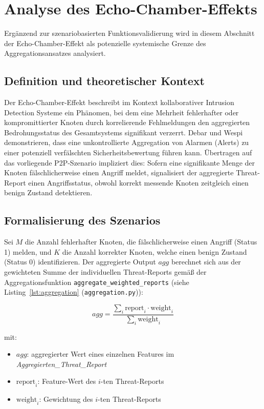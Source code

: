 \section{Analyse des Echo-Chamber-Effekts}
\label{sec:analyse_des_echo_chamber_effekts}
Ergänzend zur szenariobasierten Funktionsvalidierung wird in diesem Abschnitt der Echo-Chamber-Effekt als potenzielle systemische Grenze des Aggregationsansatzes analysiert.

\subsection{Definition und theoretischer Kontext}
Der Echo-Chamber-Effekt beschreibt im Kontext kollaborativer Intrusion Detection Systeme ein Phänomen, bei dem eine Mehrheit fehlerhafter oder kompromittierter Knoten durch korrelierende Fehlmeldungen den aggregierten Bedrohungsstatus des Gesamtsystems signifikant verzerrt. 
Debar und Wespi \cite{debar2001aggregation} demonstrieren, dass eine unkontrollierte Aggregation von Alarmen (Alerts) zu einer potenziell verfälschten Sicherheitsbewertung führen kann. Übertragen auf das vorliegende P2P-Szenario impliziert dies: Sofern eine signifikante Menge der Knoten fälschlicherweise einen Angriff meldet, signalisiert der aggregierte Threat-Report einen Angriffsstatus, obwohl korrekt messende Knoten zeitgleich einen benign Zustand detektieren.

\subsection{Formalisierung des Szenarios}
Sei $M$ die Anzahl fehlerhafter Knoten, die fälschlicherweise einen Angriff (Status 1) melden, und $K$ die Anzahl korrekter Knoten, welche einen benign Zustand (Status 0) identifizieren. Der aggregierte Output $agg$ berechnet sich aus der gewichteten Summe der individuellen Threat-Reports gemäß der Aggregationsfunktion \texttt{aggregate\_weighted\_reports} (siehe Listing~\ref{lst:aggregation} (\texttt{aggregation.py})):

\begin{equation}
    agg = \frac{\sum_{i} \text{report}_i \cdot \text{weight}_i}{\sum_{i} \text{weight}_i}
\end{equation}

\vspace{0.2cm}

\noindent
mit:
\begin{itemize}
    \item \(agg\): aggregierter Wert eines einzelnen Features im \textit{Aggregierten\_Threat\_Report}
    \item \(\text{report}_i\): Feature-Wert des \(i\)-ten Threat-Reports
    \item \(\text{weight}_i\): Gewichtung des \(i\)-ten Threat-Reports
\end{itemize}

